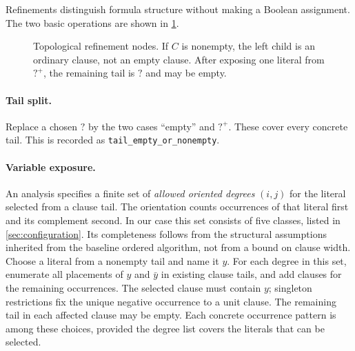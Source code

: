 \documentclass[11pt]{article}
\newcommand{\anytail}{\mathord{?}}
\newcommand{\plustail}{\mathord{?}^{+}}
\theoremstyle{definition}
\theoremstyle{remark}
\begin{document}
Refinements distinguish formula structure without making a Boolean assignment.
The two basic operations are shown in \cref{fig:refinement}.

\begin{figure}[!htbp]
\centering
{}
\caption{Topological refinement nodes. If $C$ is nonempty, the left child is
an ordinary clause, not an empty clause. After exposing one literal from
$\plustail$, the remaining tail is $\anytail$ and may be empty.}
\label{fig:refinement}
\end{figure}

\paragraph{Tail split.}
Replace a chosen $\anytail$ by the two cases ``empty'' and $\plustail$. These cover every
concrete tail. This is recorded as \texttt{tail\_empty\_or\_nonempty}.

\paragraph{Variable exposure.}
An analysis specifies a finite set of \emph{allowed oriented degrees}
$(i,j)$ for the literal selected from a clause tail. The orientation counts
occurrences of that literal first and its complement second. In our case this
set consists of five classes, listed in \cref{sec:configuration}. Its
completeness follows from the structural assumptions inherited from the baseline
ordered algorithm, not from a bound on clause width.
Choose a literal from a nonempty tail and name it $y$. For each degree in
this set, enumerate all placements of $y$ and $\bar y$ in
existing clause tails, and add clauses for the remaining occurrences.
The selected clause must contain $y$; singleton restrictions fix the unique
negative occurrence to a unit clause. The remaining tail in each affected
clause may be empty. Each concrete occurrence pattern is among these choices,
provided the degree list covers the literals that can be selected.
\end{document}
